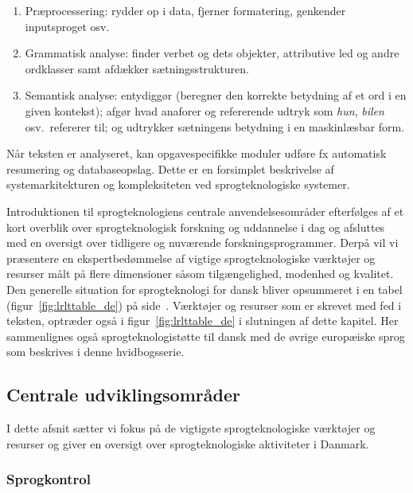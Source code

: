 \begin{multicols}{2}
\begin{enumerate}
  \item Pr\ae processering: rydder op i data, fjerner formate\-ring, genkender inputsproget osv.
      \item Grammatisk analyse: finder verbet og dets objekter, attributive led og andre ordklasser samt afd\ae kker s\ae tningsstrukturen.
      \item Semantisk analyse: entydigg\o r (beregner den korrekte betydning af et ord i en given kontekst); afg\o r hvad anaforer og refererende udtryk som {\it hun}, {\it bilen} osv.\ refererer til; og udtrykker s\ae tningens betydning i en maskinl\ae sbar form.
\end{enumerate}

N\aa r teksten er analyseret, kan opgavespecifikke mo\-duler udf\o re fx automatisk resumering og databaseopslag. Dette er en forsimplet beskrivelse af systemarkitekturen og kompleksiteten ved sprogteknologiske systemer.

Introduktionen til sprogteknologiens centrale anvendelsesomr\aa der efterf\o lges af et kort overblik over sprogteknologisk forskning og uddannelse i dag og afsluttes med en oversigt over tidligere og nuv\ae rende forskningsprogrammer. \mbox{Derp\aa} vil vi pr\ae sentere en ekspertbed\o mmelse af vigtige sprogteknologiske v\ae rkt\o jer og resurser m\aa lt \mbox{p\aa} flere dimensioner s\aa som tilg\ae ngelighed, modenhed og kvalitet. Den generelle situation for sprogteknologi for dansk bliver opsummeret i en tabel (figur~\ref{fig:lrlttable_de}) \mbox{p\aa} side~\pageref{fig:lrlttable_de}. V\ae rkt\o jer og resurser som er skrevet med fed i teksten, optr\ae der \mbox{ogs\aa} i figur~\ref{fig:lrlttable_de} i slutningen af dette kapitel. Her sammenlignes \mbox{ogs\aa} sprogteknologist\o tte til dansk med de \o vrige europ\ae iske sprog som beskrives i denne hvidbogsserie.


\subsection{Centrale udviklingsområder} 

I dette afsnit s\ae tter vi fokus \mbox{p\aa} de vigtigste sprogteknologiske v\ae rkt\o jer og resurser og giver en oversigt over sprogteknologiske aktiviteter i Danmark. 


\subsubsection{Sprogkontrol}


\end{multicols}
